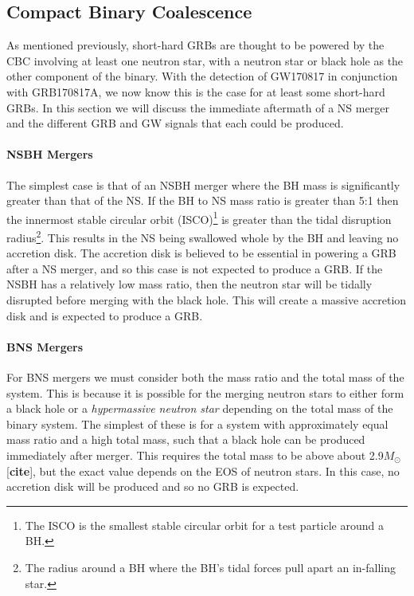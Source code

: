 \documentclass[11pt]{cuthesis}
\begin{document}
\subsection{Compact Binary Coalescence}
As mentioned previously, short-hard GRBs are thought to be powered by the CBC involving at least one neutron star, with a neutron star or black hole as the other component of the binary. With the detection of GW170817 in conjunction with GRB170817A, we now know this is the case for at least some short-hard GRBs. In this section we will discuss the immediate aftermath of a NS merger and the different GRB and GW signals that each could be produced.

\paragraph{NSBH Mergers} The simplest case is that of an NSBH merger where the BH mass is significantly greater than that of the NS. If the BH to NS mass ratio is greater than 5:1 then the innermost stable circular orbit (ISCO)\footnote{The ISCO is the smallest stable circular orbit for a test particle around a BH.} is greater than the tidal disruption radius\footnote{The radius around a BH where the BH's tidal forces pull apart an in-falling star.}. This results in the NS being swallowed whole by the BH and leaving no accretion disk. The accretion disk is believed to be essential in powering a GRB after a NS merger, and so this case is not expected to produce a GRB. If the NSBH has a relatively low mass ratio, then the neutron star will be tidally disrupted before merging with the black hole. This will create a massive accretion disk and is expected to produce a GRB. 

\paragraph{BNS Mergers} For BNS mergers we must consider both the mass ratio and the total mass of the system. This is because it is possible for the merging neutron stars to either form a black hole or a \textit{hypermassive neutron star} depending on the total mass of the binary system. The simplest of these is for a system with approximately equal mass ratio and a high total mass, such that a black hole can be produced immediately after merger. This requires the total mass to be above about 2.9$M_\odot$ [\textbf{cite}], but the exact value depends on the EOS of neutron stars. In this case, no accretion disk will be produced and so no GRB is expected. 
\end{document}
